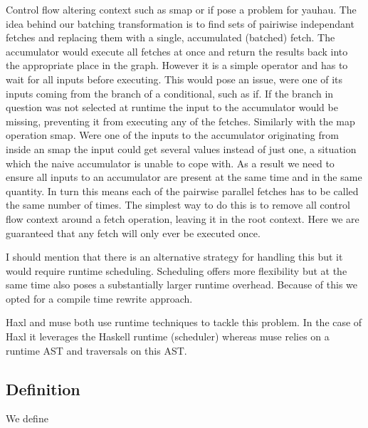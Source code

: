 Control flow altering context such as smap or if pose a problem for yauhau.
The idea behind our batching transformation is to find sets of pairiwise independant fetches and replacing them with a single, accumulated (batched) fetch.
The accumulator would execute all fetches at once and return the results back into the appropriate place in the graph.
However it is a simple operator and has to wait for all inputs before executing.
This would pose an issue, were one of its inputs coming from the branch of a conditional, such as if.
If the branch in question was not selected at runtime the input to the accumulator would be missing, preventing it from executing any of the fetches.
Similarly with the map operation smap.
Were one of the inputs to the accumulator originating from inside an smap the input could get several values instead of just one, a situation which the naive accumulator is unable to cope with.
As a result we need to ensure all inputs to an accumulator are present at the same time and in the same quantity.
In turn this means each of the pairwise parallel fetches has to be called the same number of times.
The simplest way to do this is to remove all control flow context around a fetch operation, leaving it in the root context.
Here we are guaranteed that any fetch will only ever be executed once.

I should mention that there is an alternative strategy for handling this but it would require runtime scheduling.
Scheduling offers more flexibility but at the same time also poses a substantially larger runtime overhead.
Because of this we opted for a compile time rewrite approach.

Haxl and muse both use runtime techniques to tackle this problem.
In the case of Haxl it leverages the Haskell runtime (scheduler) whereas muse relies on a runtime AST and traversals on this AST.

\subsubsection{}

\subsection{Definition}

We define

